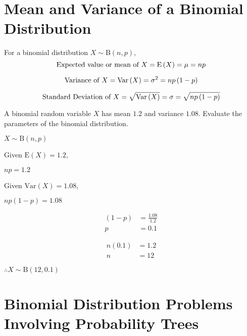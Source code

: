 \documentclass[11pt,a4paper]{book}
\begin{document}
\section{Mean and Variance of a Binomial Distribution}

\begin{tcolorbox}[colback=blue!5, colframe=black, boxrule=.4pt, sharpish corners]

For a binomial distribution $X\sim\text{B}\left(n,p\right)$,
\[
\text{Expected value or mean of \ensuremath{X}}=\text{E}\left(X\right)=\mu=np
\]

\[
\text{Variance of \ensuremath{X}}=\text{Var}\left(X\right)=\sigma^{2}=np\left(1-p\right)
\]

\[
\text{Standard Deviation of \ensuremath{X}}=\sqrt{\text{Var}\left(X\right)}=\sigma=\sqrt{np\left(1-p\right)}
\]
\end{tcolorbox}

\begin{example}

A binomial random variable $X$ has mean $1.2$ and variance $1.08$.
Evaluate the parameters of the binomial distribution.

\Solution

$X\sim\text{B}\left(n,p\right)$

Given $\text{E}\left(X\right)=1.2$,

$np=1.2$

Given $\text{Var}\left(X\right)=1.08$,

$np\left(1-p\right)=1.08$

\begin{align*}
\left(1-p\right) & =\frac{1.08}{1.2}\\
p & =0.1
\end{align*}

\begin{align*}
n\left(0.1\right) & =1.2\\
n & =12
\end{align*}

$\therefore X\sim\text{B}\left(12,0.1\right)$
\end{example}

\newpage


\section{Binomial Distribution Problems Involving Probability Trees}
\end{document}
